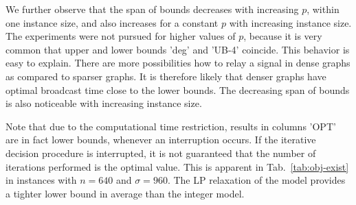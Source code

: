 We further observe that the span of bounds decreases with increasing $p$, within one instance size, and also increases for a constant $p$ with increasing instance size.
The experiments were not pursued for higher values of $p$, because it is very common that upper and lower bounds 'deg' and 'UB-4' coincide.
This behavior is easy to explain.
There are more possibilities how to relay a signal in dense graphs as compared to sparser graphs. 
It is therefore likely that denser graphs have optimal broadcast time close to the lower bounds.
The decreasing span of bounds is also noticeable with increasing instance size.

Note that due to the computational time restriction, results in columns 'OPT' are in fact lower bounds, whenever an interruption occurs.
If the iterative decision procedure is interrupted, it is not guaranteed that the number of iterations performed is the optimal value.
This is apparent in Tab.~\ref{tab:obj-exist} in instances with $n=640$ and $\sigma=960$. 
The LP relaxation of the model provides a tighter lower bound in average than the integer model.

